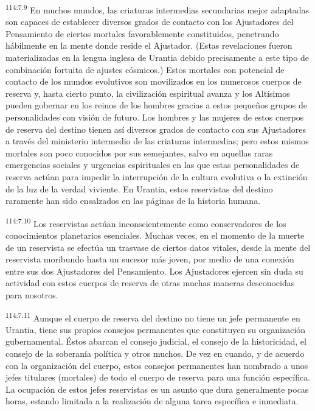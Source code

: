 \documentclass[twoside, 11pt]{book}
\begin{document}
\par
\textsuperscript{114:7.9} En muchos mundos, las criaturas intermedias secundarias mejor adaptadas son capaces de establecer diversos grados de contacto con los Ajustadores del Pensamiento de ciertos mortales favorablemente constituidos, penetrando hábilmente en la mente donde reside el Ajustador. (Estas revelaciones fueron materializadas en la lengua inglesa de Urantia debido precisamente a este tipo de combinación fortuita de ajustes cósmicos.) Estos mortales con potencial de contacto de los mundos evolutivos son movilizados en los numerosos cuerpos de reserva y, hasta cierto punto, la civilización espiritual avanza y los Altísimos pueden gobernar en los reinos de los hombres gracias a estos pequeños grupos de personalidades con visión de futuro. Los hombres y las mujeres de estos cuerpos de reserva del destino tienen así diversos grados de contacto con sus Ajustadores a través del ministerio intermedio de las criaturas intermedias; pero estos mismos mortales son poco conocidos por sus semejantes, salvo en aquellas raras emergencias sociales y urgencias espirituales en las que estas personalidades de reserva actúan para impedir la interrupción de la cultura evolutiva o la extinción de la luz de la verdad viviente. En Urantia, estos reservistas del destino raramente han sido ensalzados en las páginas de la historia humana.

\par
\textsuperscript{114:7.10} Los reservistas actúan inconscientemente como conservadores de los conocimientos planetarios esenciales. Muchas veces, en el momento de la muerte de un reservista se efectúa un trasvase de ciertos datos vitales, desde la mente del reservista moribundo hasta un sucesor más joven, por medio de una conexión entre sus dos Ajustadores del Pensamiento. Los Ajustadores ejercen sin duda su actividad con estos cuerpos de reserva de otras muchas maneras desconocidas para nosotros.

\par
\textsuperscript{114:7.11} Aunque el cuerpo de reserva del destino no tiene un jefe permanente en Urantia, tiene sus propios consejos permanentes que constituyen su organización gubernamental. Éstos abarcan el consejo judicial, el consejo de la historicidad, el consejo de la soberanía política y otros muchos. De vez en cuando, y de acuerdo con la organización del cuerpo, estos consejos permanentes han nombrado a unos jefes titulares (mortales) de todo el cuerpo de reserva para una función específica. La ocupación de estos jefes reservistas es un asunto que dura generalmente pocas horas, estando limitada a la realización de alguna tarea específica e inmediata.
\end{document}
